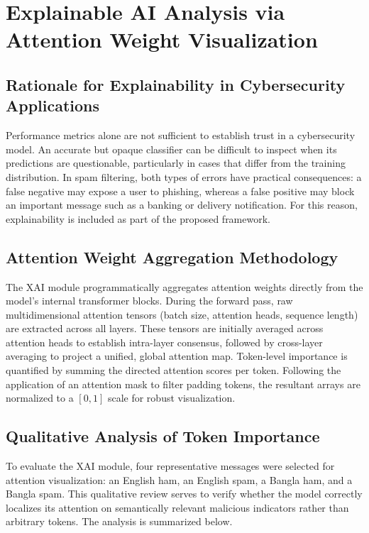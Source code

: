 \documentclass[journal]{IEEEtran}
\begin{document}
\section{Explainable AI Analysis via Attention Weight Visualization}

\subsection{Rationale for Explainability in Cybersecurity Applications}

Performance metrics alone are not sufficient to establish trust in a cybersecurity model. An accurate but opaque classifier can be difficult to inspect when its predictions are questionable, particularly in cases that differ from the training distribution. In spam filtering, both types of errors have practical consequences: a false negative may expose a user to phishing, whereas a false positive may block an important message such as a banking or delivery notification. For this reason, explainability is included as part of the proposed framework.

\subsection{Attention Weight Aggregation Methodology}

The XAI module programmatically aggregates attention weights directly from the model's internal transformer blocks. During the forward pass, raw multidimensional attention tensors (batch size, attention heads, sequence length) are extracted across all layers. These tensors are initially averaged across attention heads to establish intra-layer consensus, followed by cross-layer averaging to project a unified, global attention map. Token-level importance is quantified by summing the directed attention scores per token. Following the application of an attention mask to filter padding tokens, the resultant arrays are normalized to a $[0, 1]$ scale for robust visualization.

\subsection{Qualitative Analysis of Token Importance}

To evaluate the XAI module, four representative messages were selected for attention visualization: an English ham, an English spam, a Bangla ham, and a Bangla spam. This qualitative review serves to verify whether the model correctly localizes its attention on semantically relevant malicious indicators rather than arbitrary tokens. The analysis is summarized below.
\end{document}
